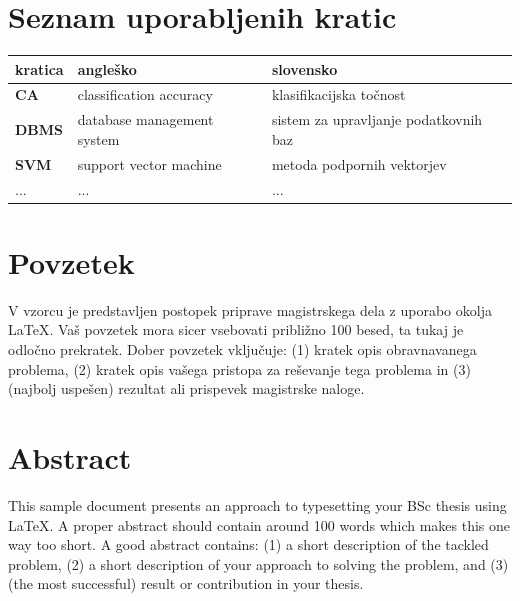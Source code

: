 \documentclass[a4paper, 12pt]{book}
\newcommand{\clearemptydoublepage}{\newpage{\pagestyle{empty}\cleardoublepage}}
\begin{document}
\chapter*{Seznam uporabljenih kratic}

\begin{tabular}{l|l|l}
  {\bf kratica} & {\bf angleško} & {\bf slovensko} \\ \hline
  {\bf CA} & classification accuracy & klasifikacijska točnost \\
  {\bf DBMS} & database management system & sistem za upravljanje podatkovnih baz \\
  {\bf SVM} & support vector machine & metoda podpornih vektorjev \\
  ... & ... & ... \\
\end{tabular}



\clearemptydoublepage


\chapter*{Povzetek}
V vzorcu je predstavljen postopek priprave magistrskega dela z uporabo okolja \LaTeX. Vaš povzetek mora sicer vsebovati približno 100 besed, ta tukaj je odločno prekratek. Dober povzetek vključuje: (1) kratek opis obravnavanega problema, (2) kratek opis vašega pristopa za reševanje tega problema in (3) (najbolj uspešen) rezultat ali prispevek magistrske naloge.
\clearemptydoublepage

\chapter*{Abstract}
This sample document presents an approach to typesetting your BSc thesis using \LaTeX. A proper abstract should contain around 100 words which makes this one way too short. A good abstract contains: (1) a short description of the tackled problem, (2) a short description of your approach to solving the problem, and (3) (the most successful) result or contribution in your thesis.

\clearemptydoublepage

\mainmatter
\setcounter{page}{1}
\pagestyle{fancy}
\end{document}
